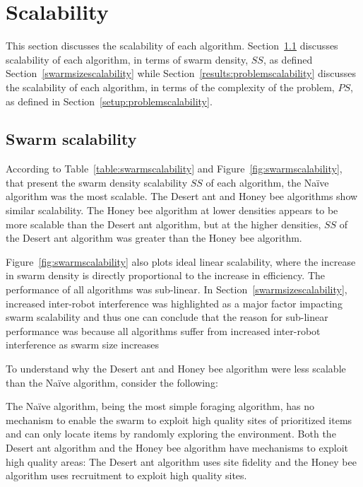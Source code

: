 \section{Scalability}
\label{results:scalability}

This section discusses the scalability of each algorithm. Section~\ref{results:swarmscalability} discusses scalability of each algorithm, in terms of swarm density, $SS$, as defined Section~\ref{swarmsizescalability} while Section~\ref{results:problemscalability} discusses the scalability of each algorithm, in terms of the complexity of the problem, $PS$, as defined in Section~\ref{setup:problemscalability}.

\subsection{Swarm scalability}
\label{results:swarmscalability}
According to Table~\ref{table:swarmscalability} and Figure~\ref{fig:swarmscalability}, that present the swarm density scalability $SS$ of each algorithm, the Na\"ive algorithm was the most scalable. The Desert ant and Honey bee algorithms show similar scalability. The Honey bee algorithm at lower densities appears to be more scalable than the Desert ant algorithm, but at the higher densities, $SS$ of the Desert ant algorithm was greater than the Honey bee algorithm. %

Figure~\ref{fig:swarmscalability} also plots ideal linear scalability, where the increase in swarm density is directly proportional to the increase in efficiency. The performance of all algorithms was sub-linear. In Section~\ref{swarmsizescalability}, increased inter-robot interference was highlighted as a major factor impacting swarm scalability and thus one can conclude that the reason for sub-linear performance was because all algorithms suffer from increased inter-robot interference as swarm size increases

To understand why the Desert ant and Honey bee algorithm were less scalable than the Na\"ive algorithm, consider the following:

The Na\"ive algorithm, being the most simple foraging algorithm, has no mechanism to enable the swarm to exploit high quality sites of prioritized items and can only locate items by randomly exploring the environment. Both the Desert ant algorithm and the Honey bee algorithm have mechanisms to exploit high quality areas: The Desert ant algorithm uses site fidelity and the Honey bee algorithm uses recruitment to exploit high quality sites. 

